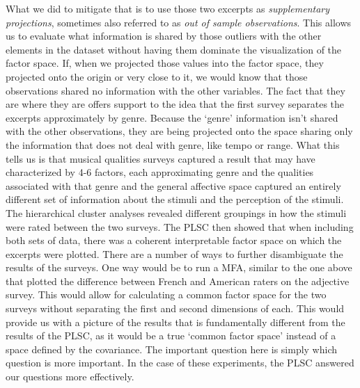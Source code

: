 \documentclass[
  english,
  man,floatsintext]{apa6}
\begin{document}
What we did to mitigate that is to use those two excerpts as \emph{supplementary projections}, sometimes also referred to as \emph{out of sample observations}. This allows us to evaluate what information is shared by those outliers with the other elements in the dataset without having them dominate the visualization of the factor space. If, when we projected those values into the factor space, they projected onto the origin or very close to it, we would know that those observations shared no information with the other variables. The fact that they are where they are offers support to the idea that the first survey separates the excerpts approximately by genre. Because the `genre' information isn't shared with the other observations, they are being projected onto the space sharing only the information that does not deal with genre, like tempo or range. What this tells us is that musical qualities surveys captured a result that may have characterized by 4-6 factors, each approximating genre and the qualities associated with that genre and the general affective space captured an entirely different set of information about the stimuli and the perception of the stimuli.\\
The hierarchical cluster analyses revealed different groupings in how the stimuli were rated between the two surveys. The PLSC then showed that when including both sets of data, there was a coherent interpretable factor space on which the excerpts were plotted. There are a number of ways to further disambiguate the results of the surveys. One way would be to run a MFA, similar to the one above that plotted the difference between French and American raters on the adjective survey. This would allow for calculating a common factor space for the two surveys without separating the first and second dimensions of each. This would provide us with a picture of the results that is fundamentally different from the results of the PLSC, as it would be a true `common factor space' instead of a space defined by the covariance. The important question here is simply which question is more important. In the case of these experiments, the PLSC answered our questions more effectively.\\
\end{document}
